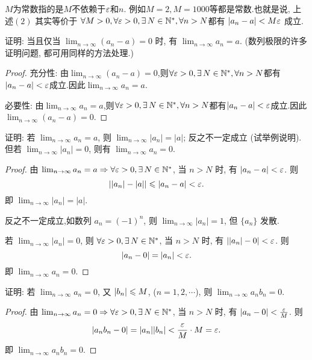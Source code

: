 $M$为常数指的是$M$不依赖于$\varepsilon$和$n$. 例如$M=2, M=1000$等都是常数.也就是说, 上述$(2)$ 其实等价于
$\forall M > 0, \forall \ve >0, \exists N\in \mathbb{N}^*, \forall n>N $都有 $|a_n-a|<M \varepsilon$ 成立.

\begin{exercise}[1.2.3]
    证明: 当且仅当 $\lim_{n\to\infty} (a_n - a) = 0$ 时, 有 $\lim_{n\to\infty} a_n = a$. (数列极限的许多证明问题, 都可用同样的方法处理.)
\end{exercise}

\begin{proof}
    充分性: 由$\lim_{n \to \infty} (a_n - a) = 0$,则$\forall \ve > 0, \exists N \in \mathbb{N}^*, \forall n > N$都有$|a_n - a| < \varepsilon$成立.因此$\lim_{n \to \infty} a_n = a$.

    必要性: 由$\lim_{n \to \infty} a_n = a$,则$\forall \ve > 0, \exists N \in \mathbb{N}^*, \forall n > N$都有$|a_n - a| < \varepsilon$成立.因此$\lim_{n \to \infty} (a_n - a) = 0$.
\end{proof}

\begin{exercise}[1.2.4]
    证明: 若 $\lim_{n\to\infty} a_n = a$, 则 $\lim_{n\to\infty} |a_n| = |a|$; 反之不一定成立 (试举例说明). 但若 $\lim_{n\to\infty} |a_n| = 0$, 则有 $\lim_{n\to\infty} a_n = 0$.
\end{exercise}

\begin{proof}
    由 $\lim_{n\to\infty} a_n = a \Rightarrow \forall \ve > 0, \exists N \in \mathbb{N}^*$, 当 $n > N$ 时, 有 $|a_n - a| < \varepsilon$. 则
    $$
        ||a_n| - |a|| \leqslant |a_n - a| < \varepsilon.
    $$
    即 $\lim_{n\to\infty} |a_n| = |a|$.

    反之不一定成立,如数列 $a_n = (-1)^n$, 则 $\lim_{n\to\infty} |a_n| = 1$, 但 $\{a_n\}$ 发散.

    若 $\lim_{n\to\infty} |a_n| = 0$, 则 $\forall \ve > 0, \exists N \in \mathbb{N}^*$, 当 $n > N$ 时, 有 $||a_n| - 0| < \varepsilon$. 则
    $$
        |a_n - 0| = |a_n| < \varepsilon.
    $$
    即 $\lim_{n\to\infty} a_n = 0$.
\end{proof}


\begin{exercise}[1.2.5]
    证明: 若 $\lim_{n\to\infty} a_n = 0$, 又 $|b_n| \leqslant M$, ($n=1,2,\cdots$), 则 $\lim_{n\to\infty} a_n b_n = 0$.
\end{exercise}

\begin{proof}
    由 $\lim_{n\to\infty} a_n = 0 \Rightarrow \forall \ve > 0, \exists N \in \mathbb{N}^*$, 当 $n > N$ 时, 有 $|a_n - 0| < \frac{\varepsilon}{M}$. 则
    $$
        |a_n b_n - 0| = |a_n| |b_n| < \frac{\varepsilon}{M} \cdot M = \varepsilon.
    $$
    即 $\lim_{n\to\infty} a_n b_n = 0$.
\end{proof}

